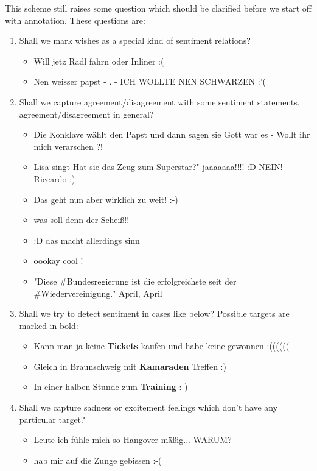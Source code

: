 \documentclass[11pt,a4paper]{article}
\begin{document}
This scheme still raises some question which should be clarified
before we start off with annotation. These questions are:
\begin{enumerate}
\item Shall we mark wishes as a special kind of sentiment relations?
  \begin{itemize}
  \item Will jetz Radl fahrn oder Inliner :(
  \item Nen weisser papst - . - ICH WOLLTE NEN SCHWARZEN :'(
  \end{itemize}

\item Shall we capture agreement/disagreement with some sentiment
  statements, agreement/disagreement in general?
  \begin{itemize}
  \item Die Konklave w\"ahlt den Papst und dann sagen sie Gott war es
    - Wollt ihr mich verarschen ?!
  \item Lisa singt Hat sie das Zeug zum Superstar?" jaaaaaaa!!!! :D
    NEIN! Riccardo :)
  \item Das geht nun aber wirklich zu weit! :-)
  \item was soll denn der Schei\ss!!
  \item :D das macht allerdings sinn
  \item oookay cool !
  \item "Diese \#{}Bundesregierung ist die erfolgreichste seit der
    \#{}Wiedervereinigung." April, April
  \end{itemize}

\item Shall we try to detect sentiment in cases like below? Possible
  targets are marked in bold:
  \begin{itemize}
  \item Kann man ja keine \textbf{Tickets} kaufen und habe keine gewonnen :((((((
  \item Gleich in Braunschweig mit \textbf{Kamaraden} Treffen :)
  \item In einer halben Stunde zum \textbf{Training} :-)
  \end{itemize}

\item Shall we capture sadness or excitement feelings which don't have
  any particular target?
  \begin{itemize}
  \item Leute ich f\"uhle mich so Hangover m\"a\ss{}ig... WARUM?
  \item hab mir auf die Zunge gebissen :-(
  \end{itemize}
\end{enumerate}
\end{document}
